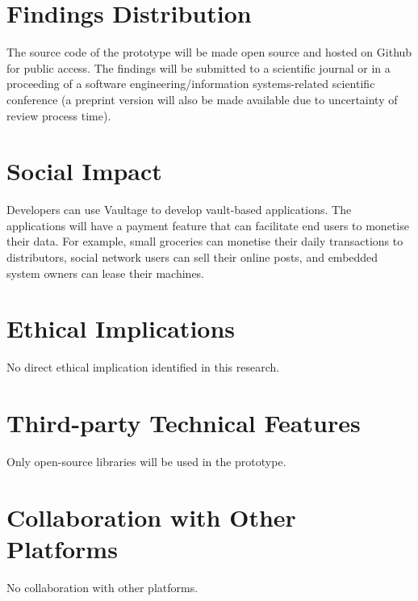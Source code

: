 \documentclass[]{article}
\begin{document}
\section{Findings Distribution}
\label{sec:findings_distribution}
The source code of the prototype will be made open source and hosted on Github for public access. The findings will be submitted to a scientific journal or in a proceeding of a software engineering/information systems-related scientific conference (a preprint version will also be made available due to uncertainty of review process time).   

\section{Social Impact}
Developers can use Vaultage to develop vault-based applications. The applications will have a payment feature that can facilitate end users to monetise their data. For example, small groceries can monetise their daily transactions to distributors, social network users can sell their online posts, and embedded system owners can lease their machines.     

\section{Ethical Implications}
No direct ethical implication identified in this research.

\section{Third-party Technical Features}
Only open-source libraries will be used in the prototype.  

\section{Collaboration with Other Platforms}
No collaboration with other platforms.

%
%
%
\end{document}

